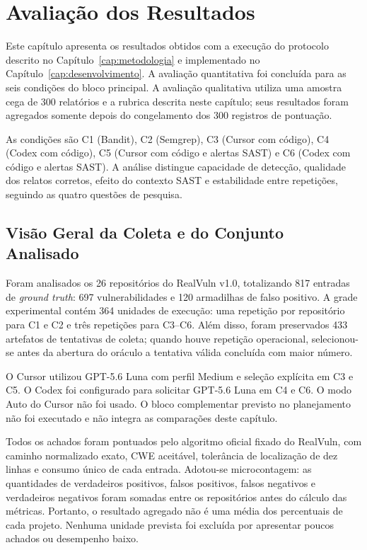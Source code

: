 \chapter{Avaliação dos Resultados}\label{cap:avaliacao}

Este capítulo apresenta os resultados obtidos com a execução do protocolo descrito no
Capítulo~\ref{cap:metodologia} e implementado no Capítulo~\ref{cap:desenvolvimento}.
A avaliação quantitativa foi concluída para as seis condições do bloco principal. A
avaliação qualitativa utiliza uma amostra cega de 300 relatórios e a rubrica
descrita neste capítulo; seus resultados foram agregados somente depois do
congelamento dos 300 registros de pontuação.

As condições são C1 (Bandit), C2 (Semgrep), C3 (Cursor com código), C4 (Codex
com código), C5 (Cursor com código e alertas SAST) e C6 (Codex com código e
alertas SAST). A análise distingue capacidade de detecção, qualidade dos relatos
corretos, efeito do contexto SAST e estabilidade entre repetições, seguindo as
quatro questões de pesquisa.

\section{Visão Geral da Coleta e do Conjunto Analisado}\label{sec:visao-geral-coleta}

Foram analisados os 26 repositórios do RealVuln v1.0, totalizando 817 entradas de
\textit{ground truth}: 697 vulnerabilidades e 120 armadilhas de falso positivo. A
grade experimental contém 364 unidades de execução: uma repetição por repositório
para C1 e C2 e três repetições para C3--C6. Além disso, foram preservados 433
artefatos de tentativas de coleta; quando houve repetição operacional, selecionou-se
antes da abertura do oráculo a tentativa válida concluída com maior número.

O Cursor utilizou GPT-5.6 Luna com perfil Medium e seleção explícita em C3 e C5.
O Codex foi configurado para solicitar GPT-5.6 Luna em C4 e C6. O modo Auto do Cursor não foi usado.
O bloco complementar previsto no planejamento não foi executado e não integra
as comparações deste capítulo.

Todos os achados foram pontuados pelo algoritmo oficial fixado do RealVuln, com
caminho normalizado exato, CWE aceitável, tolerância de localização de dez linhas
e consumo único de cada entrada. Adotou-se microcontagem: as quantidades de
verdadeiros positivos, falsos positivos, falsos negativos e verdadeiros negativos
foram somadas entre os repositórios antes do cálculo das métricas. Portanto, o
resultado agregado não é uma média dos percentuais de cada projeto. Nenhuma
unidade prevista foi excluída por apresentar poucos achados ou desempenho baixo.

